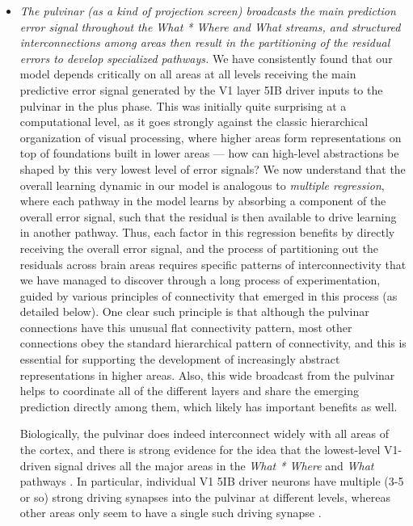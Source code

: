 \documentclass[11pt,twoside]{article}
\newif\myifpdf
\begin{document}
\begin{itemize}
\item \emph{The pulvinar (as a kind of projection screen) broadcasts the main prediction error signal throughout the \emph{What * Where} and \emph{What} streams, and structured interconnections among areas then result in the partitioning of the residual errors to develop specialized pathways.}  We have consistently found that our model depends critically on all areas at all levels receiving the main predictive error signal generated by the V1 layer 5IB driver inputs to the pulvinar in the plus phase.  This was initially quite surprising at a computational level, as it goes strongly against the classic hierarchical organization of visual processing, where higher areas form representations on top of foundations built in lower areas --- how can high-level abstractions be shaped by this very lowest level of error signals?  We now understand that the overall learning dynamic in our model is analogous to \emph{multiple regression}, where each pathway in the model learns by  absorbing a component of the overall error signal, such that the residual is then available to drive learning in another pathway.  Thus, each factor in this regression benefits by directly receiving the overall error signal, and the process of partitioning out the residuals across brain areas requires specific patterns of interconnectivity that we have managed to discover through a long process of experimentation, guided by various principles of connectivity that emerged in this process (as detailed below).  One clear such principle is that although the pulvinar connections have this unusual flat connectivity pattern, most other connections obey the standard hierarchical pattern of connectivity, and this is essential for supporting the development of increasingly abstract representations in higher areas.  Also, this wide broadcast from the pulvinar helps to coordinate all of the different layers and share the emerging prediction directly among them, which likely has important benefits as well.

Biologically, the pulvinar does indeed interconnect widely with all areas of the cortex, and there is strong evidence for the idea that the lowest-level V1-driven signal drives all the major areas in the {\em What * Where} and {\em What} pathways \cite{Shipp03,KaasLyon07}.  In particular, individual V1 5IB driver neurons have multiple (3-5 or so) strong driving synapses into the pulvinar at different levels, whereas other areas only seem to have a single such driving synapse \cite{Rockland98a,Rockland96}.  

\end{itemize}
\end{document}
